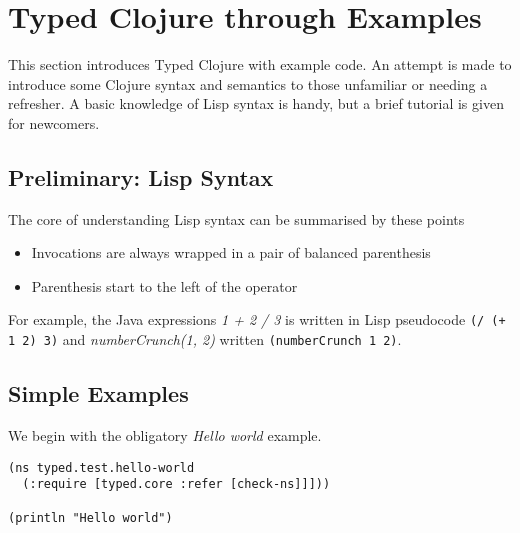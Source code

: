 

% 

\section{Typed Clojure through Examples}

This section introduces Typed Clojure with example code. An attempt is
made to introduce some Clojure syntax and semantics to those unfamiliar or needing a refresher.
A basic knowledge of Lisp syntax is handy, but a brief tutorial is given
for newcomers.

\subsection{Preliminary: Lisp Syntax}

The core of understanding Lisp syntax can be summarised by these points

\begin{itemize}
  \item Invocations are always wrapped in a pair of balanced parenthesis 
  \item Parenthesis start to the left of the operator
\end{itemize}

For example, the Java expressions \emph{1 + 2 / 3} is written in Lisp pseudocode \lstinline|(/ (+ 1 2) 3)|
and \emph{numberCrunch(1, 2)} written \lstinline|(numberCrunch 1 2)|.

\subsection{Simple Examples}

We begin with the obligatory \emph{Hello world} example.

\begin{lstlisting}[caption=Hello world]
(ns typed.test.hello-world
  (:require [typed.core :refer [check-ns]]]))

(println "Hello world")
\end{lstlisting}

